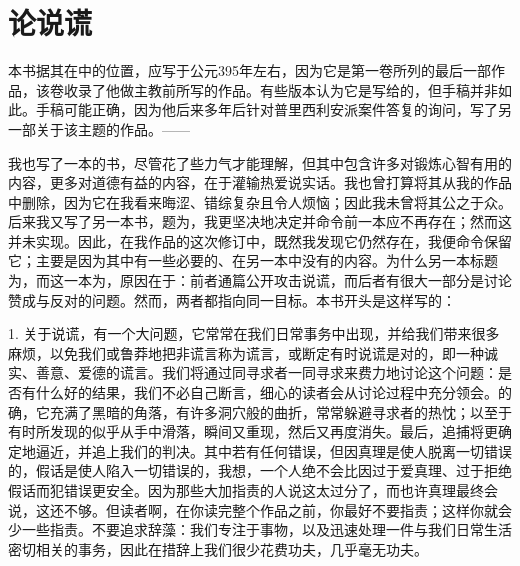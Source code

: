 
\chapter{论说谎}


\par

本书据其在中的位置，应写于公元395年左右，因为它是第一卷所列的最后一部作品，该卷收录了他做主教前所写的作品。有些版本认为它是写给的，但手稿并非如此。手稿可能正确，因为他后来多年后针对普里西利安派案件答复的询问，写了另一部关于该主题的作品。——\par

\par

我也写了一本的书，尽管花了些力气才能理解，但其中包含许多对锻炼心智有用的内容，更多对道德有益的内容，在于灌输热爱说实话。我也曾打算将其从我的作品中删除，因为它在我看来晦涩、错综复杂且令人烦恼；因此我未曾将其公之于众。后来我又写了另一本书，题为，我更坚决地决定并命令前一本应不再存在；然而这并未实现。因此，在我作品的这次修订中，既然我发现它仍然存在，我便命令保留它；主要是因为其中有一些必要的、在另一本中没有的内容。为什么另一本标题为，而这一本为，原因在于：前者通篇公开攻击说谎，而后者有很大一部分是讨论赞成与反对的问题。然而，两者都指向同一目标。本书开头是这样写的：\par

1. 关于说谎，有一个大问题，它常常在我们日常事务中出现，并给我们带来很多麻烦，以免我们或鲁莽地把非谎言称为谎言，或断定有时说谎是对的，即一种诚实、善意、爱德的谎言。我们将通过同寻求者一同寻求来费力地讨论这个问题：是否有什么好的结果，我们不必自己断言，细心的读者会从讨论过程中充分领会。的确，它充满了黑暗的角落，有许多洞穴般的曲折，常常躲避寻求者的热忱；以至于有时所发现的似乎从手中滑落，瞬间又重现，然后又再度消失。最后，追捕将更确定地逼近，并追上我们的判决。其中若有任何错误，但因真理是使人脱离一切错误的，假话是使人陷入一切错误的，我想，一个人绝不会比因过于爱真理、过于拒绝假话而犯错误更安全。因为那些大加指责的人说这太过分了，而也许真理最终会说，这还不够。但读者啊，在你读完整个作品之前，你最好不要指责；这样你就会少一些指责。不要追求辞藻：我们专注于事物，以及迅速处理一件与我们日常生活密切相关的事务，因此在措辞上我们很少花费功夫，几乎毫无功夫。\par

